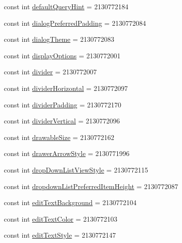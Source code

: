 \begin{CompactItemize}
\item 
const int \hyperlink{class__2doo_1_1_droid_1_1_resource_1_1_attribute_d533edbcde01c5693a1da941e5e3b53c}{defaultQueryHint} = 2130772184
\item 
const int \hyperlink{class__2doo_1_1_droid_1_1_resource_1_1_attribute_50098b9f4818622b5467f03b505deaad}{dialogPreferredPadding} = 2130772084
\item 
const int \hyperlink{class__2doo_1_1_droid_1_1_resource_1_1_attribute_bc571f819c346596fd5dbe29a2e3cd86}{dialogTheme} = 2130772083
\item 
const int \hyperlink{class__2doo_1_1_droid_1_1_resource_1_1_attribute_68a63a7d1077b26855834a7e387400d9}{displayOptions} = 2130772001
\item 
const int \hyperlink{class__2doo_1_1_droid_1_1_resource_1_1_attribute_8fc561bc3a692edb498f9a955a74cf79}{divider} = 2130772007
\item 
const int \hyperlink{class__2doo_1_1_droid_1_1_resource_1_1_attribute_88b533056f8f1b106751c4480c4d43b1}{dividerHorizontal} = 2130772097
\item 
const int \hyperlink{class__2doo_1_1_droid_1_1_resource_1_1_attribute_5b2233cae4dab86fa3aefb0ff0733532}{dividerPadding} = 2130772170
\item 
const int \hyperlink{class__2doo_1_1_droid_1_1_resource_1_1_attribute_7d2a61bced05db5b7f6da5584d356812}{dividerVertical} = 2130772096
\item 
const int \hyperlink{class__2doo_1_1_droid_1_1_resource_1_1_attribute_57e84b5f67972c137e0c12608aa24d8c}{drawableSize} = 2130772162
\item 
const int \hyperlink{class__2doo_1_1_droid_1_1_resource_1_1_attribute_11c8d7c39fd3652d1156a4487908c456}{drawerArrowStyle} = 2130771996
\item 
const int \hyperlink{class__2doo_1_1_droid_1_1_resource_1_1_attribute_1bd835c4a2a32f99c2b7f97feedc519c}{dropDownListViewStyle} = 2130772115
\item 
const int \hyperlink{class__2doo_1_1_droid_1_1_resource_1_1_attribute_4f8a0f1ef4c30708e7ae6f460a3319dc}{dropdownListPreferredItemHeight} = 2130772087
\item 
const int \hyperlink{class__2doo_1_1_droid_1_1_resource_1_1_attribute_a9fa799a98e4dc5d306609a226238024}{editTextBackground} = 2130772104
\item 
const int \hyperlink{class__2doo_1_1_droid_1_1_resource_1_1_attribute_e72efc3f7203df2dde66e0613b77602a}{editTextColor} = 2130772103
\item 
const int \hyperlink{class__2doo_1_1_droid_1_1_resource_1_1_attribute_87815307c0303401ffcdcfb3015a7a75}{editTextStyle} = 2130772147

\end{CompactItemize}
